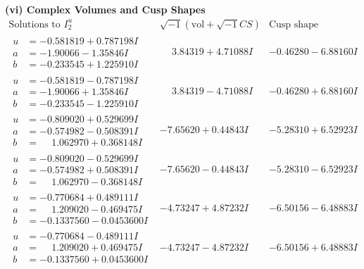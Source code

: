 \documentclass[1p]{elsarticle_modified}
\theoremstyle{definition}
\newcommand{\I}{\sqrt{-1}}
\begin{document}
\newpage\flushleft \textbf{(vi) Complex Volumes and Cusp Shapes}
$$\begin{array}{c|c|c}  
\text{Solutions to }I^u_{2}& \I (\text{vol} + \sqrt{-1}CS) & \text{Cusp shape}\\
 \hline 
\begin{aligned}
u &= -0.581819 + 0.787198 I \\
a &= -1.90066 - 1.35846 I \\
b &= -0.233545 + 1.225910 I\end{aligned}
 & \phantom{-}3.84319 + 4.71088 I & -0.46280 - 6.88160 I \\ \hline\begin{aligned}
u &= -0.581819 - 0.787198 I \\
a &= -1.90066 + 1.35846 I \\
b &= -0.233545 - 1.225910 I\end{aligned}
 & \phantom{-}3.84319 - 4.71088 I & -0.46280 + 6.88160 I \\ \hline\begin{aligned}
u &= -0.809020 + 0.529699 I \\
a &= -0.574982 - 0.508391 I \\
b &= \phantom{-}1.062970 + 0.368148 I\end{aligned}
 & -7.65620 + 0.44843 I & -5.28310 + 6.52923 I \\ \hline\begin{aligned}
u &= -0.809020 - 0.529699 I \\
a &= -0.574982 + 0.508391 I \\
b &= \phantom{-}1.062970 - 0.368148 I\end{aligned}
 & -7.65620 - 0.44843 I & -5.28310 - 6.52923 I \\ \hline\begin{aligned}
u &= -0.770684 + 0.489111 I \\
a &= \phantom{-}1.209020 - 0.469475 I \\
b &= -0.1337560 - 0.0453600 I\end{aligned}
 & -4.73247 + 4.87232 I & -6.50156 - 6.48883 I \\ \hline\begin{aligned}
u &= -0.770684 - 0.489111 I \\
a &= \phantom{-}1.209020 + 0.469475 I \\
b &= -0.1337560 + 0.0453600 I\end{aligned}
 & -4.73247 - 4.87232 I & -6.50156 + 6.48883 I \\ \hline\begin{aligned}

\end{aligned}
\end{array}$$
\end{document}
